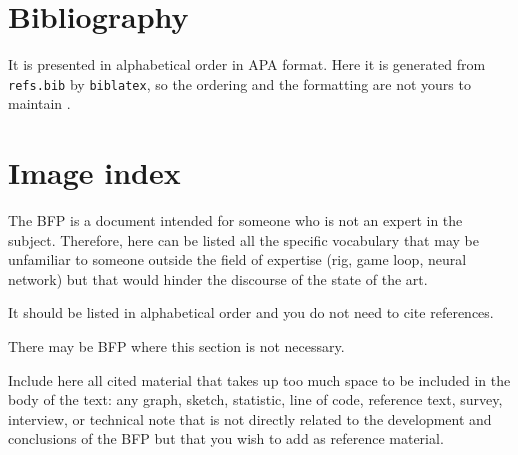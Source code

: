 \documentclass[english]{utad-tfg}
\begin{document}
\section{Bibliography}
It is presented in alphabetical order in APA format. Here it is generated
from \texttt{refs.bib} by \texttt{biblatex}, so the ordering and the
formatting are not yours to maintain \parencite{hevner2004,peffers2007,%
wieringa2014,kimball2013,loshin2008}.

\printbibliography[heading=none]

\section{Image index}
\tfgimageindex

\begin{tfgglossary}
The BFP is a document intended for someone who is not an expert in the
subject. Therefore, here can be listed all the specific vocabulary that may
be unfamiliar to someone outside the field of expertise (rig, game loop,
neural network) but that would hinder the discourse of the state of the art.

It should be listed in alphabetical order and you do not need to cite
references.

There may be BFP where this section is not necessary.
\end{tfgglossary}

\begin{tfgappendix}
Include here all cited material that takes up too much space to be included
in the body of the text: any graph, sketch, statistic, line of code,
reference text, survey, interview, or technical note that is not directly
related to the development and conclusions of the BFP but that you wish to
add as reference material.
\end{tfgappendix}
\end{document}
